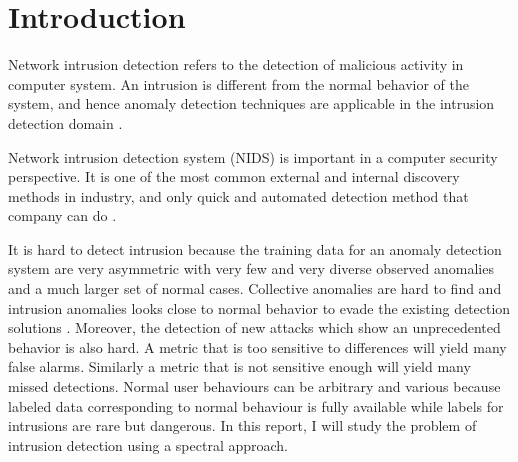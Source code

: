 \section{Introduction}
Network intrusion detection refers to the detection of malicious activity in computer system. 
An intrusion is different from the normal behavior of the system, and hence anomaly detection techniques are applicable in the intrusion detection domain \cite{chandola09}.

Network intrusion detection system (NIDS) is important in a computer security perspective. 
It is one of the most common external and internal discovery methods in industry, and only quick and automated detection method that company can do \cite{verizon14}. 

It is hard to detect intrusion because the training data for an anomaly detection system are very asymmetric with very few and very diverse observed anomalies and a much larger set of normal cases. 
Collective anomalies are hard to find and intrusion anomalies looks close to normal behavior to evade the existing detection solutions \cite{chandola09}. 
Moreover, the detection of new attacks which show an unprecedented behavior is also hard. 
A metric that is too sensitive to differences will yield many false alarms. 
Similarly a metric that is not sensitive enough will yield many missed detections.
Normal user behaviours can be arbitrary and various because labeled data corresponding to normal behaviour is fully available while labels for intrusions are rare but dangerous. 
In this report, I will study the problem of intrusion detection using a spectral approach. 
